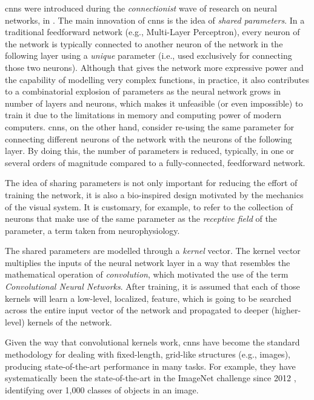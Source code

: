 

\glspl{cnn} were introduced during the \emph{connectionist}
wave of research on neural networks, in
\textcite{lecun1989generalization, lecun1989handwritten}.
The main innovation of \glspl{cnn} is the idea of
\emph{shared parameters}. In a traditional feedforward
network (e.g., Multi-Layer Perceptron), every neuron of the
network is typically connected to another neuron of the
network in the following layer using a \emph{unique}
parameter (i.e., used exclusively for connecting those two
neurons). Although that gives the network more expressive
power and the capability of modelling very complex
functions, in practice, it also contributes to a
combinatorial explosion of parameters as the neural network
grows in number of layers and neurons, which makes it
unfeasible (or even impossible) to train it due to the
limitations in memory and computing power of modern
computers. \glspl{cnn}, on the other hand, consider re-using
the same parameter for connecting different neurons of the
network with the neurons of the following layer. By doing
this, the number of parameters is reduced, typically, in one
or several orders of magnitude compared to a
fully-connected, feedforward network.

The idea of sharing parameters is not only important for
reducing the effort of training the network, it is also a
bio-inspired design motivated by the mechanics of the visual
system. It is customary, for example, to refer to the
collection of neurons that make use of the same parameter as
the \emph{receptive field} of the parameter, a term taken
from neurophysiology.

The shared parameters are modelled through a \emph{kernel}
vector. The kernel vector multiplies the inputs of the
neural network layer in a way that resembles the
mathematical operation of \emph{convolution}, which
motivated the use of the term \emph{Convolutional Neural
Networks}. After training, it is assumed that each of those
kernels will learn a low-level, localized, feature, which is
going to be searched across the entire input vector of the
network and propagated to deeper (higher-level) kernels of
the network.

Given the way that convolutional kernels work, \glspl{cnn}
have become the standard methodology for dealing with
fixed-length, grid-like structures (e.g., images), producing
state-of-the-art performance in many tasks. For example,
they have systematically been the state-of-the-art in the
ImageNet challenge since 2012
\parencite{krizhevsky2012imagenet}, identifying over 1,000
classes of objects in an image.

